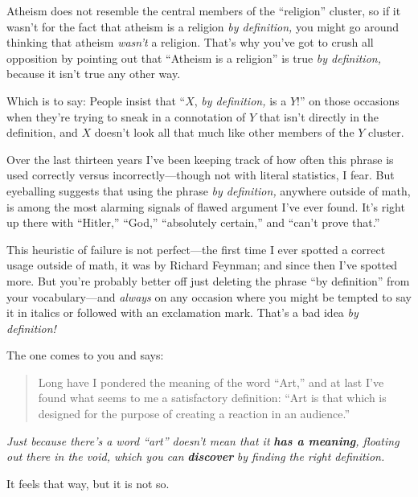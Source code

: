 {
 Atheism does not resemble the central members of the
``religion'' cluster, so if it
wasn't for the fact that atheism is a religion
\textit{by definition,} you might go around thinking that atheism
\textit{wasn't} a religion. That's why
you've got to crush all opposition by pointing out that
``Atheism is a religion'' is true
\textit{by definition,} because it isn't true any other
way.}

{
 Which is to say: People insist that ``$X$,
\textit{by definition,} is a $Y$!'' on those occasions
when they're trying to sneak in a connotation of $Y$ that
isn't directly in the definition, and $X$
doesn't look all that much like other members of the $Y$
cluster.}

{
 Over the last thirteen years I've been keeping
track of how often this phrase is used correctly versus
incorrectly---though not with literal statistics, I fear. But
eyeballing suggests that using the phrase \textit{by definition,}
anywhere outside of math, is among the most alarming signals of flawed
argument I've ever found. It's right up
there with ``Hitler,''
``God,''
``absolutely certain,'' and
``can't prove
that.''}

{
 This heuristic of failure is not perfect---the first time I ever
spotted a correct usage outside of math, it was by Richard Feynman; and
since then I've spotted more. But
you're probably better off just deleting the phrase
``by definition'' from your
vocabulary---and \textit{always} on any occasion where you might be
tempted to say it in italics or followed with an exclamation mark.
That's a bad idea \textit{by definition!}}

\myendsectiontext


{
 The one comes to you and says:}

\begin{quote}
{
 Long have I pondered the meaning of the word
``Art,'' and at last
I've found what seems to me a satisfactory definition:
``Art is that which is designed for the purpose of
creating a reaction in an audience.''}
\end{quote}

{
 \textit{Just because there's a word
``art'' doesn't mean
that it }\textbf{\textit{has a meaning}}\textit{, floating out there in
the void, which you can }\textbf{\textit{discover}}\textit{ by finding
the right definition.}}

{
 It feels that way, but it is not so.}

